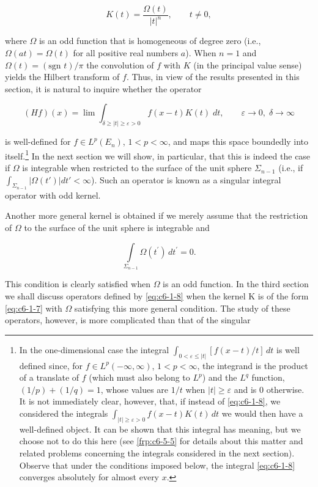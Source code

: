 \begin{equation}\label{eq:c6-1-7}
K(t)=\frac{\Omega(t)}{|t|^{n}},\qquad t\neq0,
\end{equation}

where $\Omega$ is an odd function that is homogeneous of degree zero (i.e., $\Omega(at) = \Omega(t)$ for all positive real numbers $a$). When $n = 1$ and $\Omega(t) = (\text{sgn } t)/\pi$ the convolution of $f$ with $K$ (in the principal value sense) yields the Hilbert transform of $f$. Thus, in view of the results presented in this section, it is natural to inquire whether the operator

\begin{equation}\label{eq:c6-1-8}
(H f)(x)=\lim\int_{\delta\geq|t|\geq\varepsilon>0}f(x-t)K(t)\;{d}t,\qquad\varepsilon\to0,\;\delta\to\infty
\end{equation}

is well-defined for $f\in L^p(E_n)$, $1<p<\infty$, and maps this space boundedly into itself.\footnote{In the one-dimensional case the integral $\int_{0<\varepsilon\leq|t|}[f(x - t)/t]\,dt$ is well defined since, for $f \in L^p(-\infty, \infty)$, $1 < p < \infty$, the integrand is the product of a translate of $f$ (which must also belong to $L^p$) and the $L^q$ function, $(1/p) + (1/q) = 1$, whose values are $1/t$ when $|t| \geq \varepsilon$ and is 0 otherwise. It is not immediately clear, however, that, if instead of \eqref{eq:c6-1-8}, we considered the integrals $\int_{|t| \geq \varepsilon > 0} f(x - t)K(t)\,dt$ we would then have a well-defined object. It can be shown that this integral has meaning, but we choose not to do this here (see \eqref{frp:c6-5-5} for details about this matter and related problems concerning the integrals considered in the next section). Observe that under the conditions imposed below, the integral \eqref{eq:c6-1-8} converges absolutely for almost every $x$.} In the next section we will show, in particular, that this is indeed the case if $\Omega$ is integrable when restricted to the surface of the unit sphere $\Sigma_{n-1}$ (i.e., if $\int_{\Sigma_{n-1}}|\Omega(t')|dt'<\infty$). Such an operator is known as a singular integral operator with odd kernel.

Another more general kernel is obtained if we merely assume that the restriction of $\Omega$ to the surface of the unit sphere is integrable and

\[
\int\limits_{\Sigma_{n-1}}\Omega(t^{\prime})\,dt^{\prime}=0.
\]

This condition is clearly satisfied when $\Omega$ is an odd function. In the third section we shall discuss operators defined by \eqref{eq:c6-1-8} when the kernel K is of the form \eqref{eq:c6-1-7} with $\Omega$ satisfying this more general condition. The study of these operators, however, is more complicated than that of the singular

